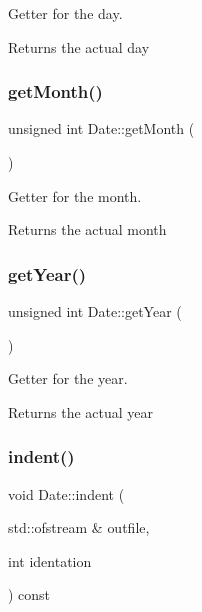 Getter for the day. 

\begin{DoxyReturn}{Returns}
the actual day 
\end{DoxyReturn}
\mbox{\label{class_date_a9efc6db1870de82dbd717f1c3c782f82}} 
\subsubsection{\texorpdfstring{get\+Month()}{getMonth()}}
{\footnotesize\ttfamily unsigned int Date\+::get\+Month (\begin{DoxyParamCaption}{ }\end{DoxyParamCaption})}



Getter for the month. 

\begin{DoxyReturn}{Returns}
the actual month 
\end{DoxyReturn}
\mbox{\label{class_date_a90be6a509b91ee9addfeec0e68b965e2}} 
\subsubsection{\texorpdfstring{get\+Year()}{getYear()}}
{\footnotesize\ttfamily unsigned int Date\+::get\+Year (\begin{DoxyParamCaption}{ }\end{DoxyParamCaption})}



Getter for the year. 

\begin{DoxyReturn}{Returns}
the actual year 
\end{DoxyReturn}
\mbox{\label{class_date_a71cb9aebbc36dc421d720764cacd681a}} 
\subsubsection{\texorpdfstring{indent()}{indent()}}
{\footnotesize\ttfamily void Date\+::indent (\begin{DoxyParamCaption}\item[{std\+::ofstream \&}]{outfile,  }\item[{int}]{identation }\end{DoxyParamCaption}) const}



